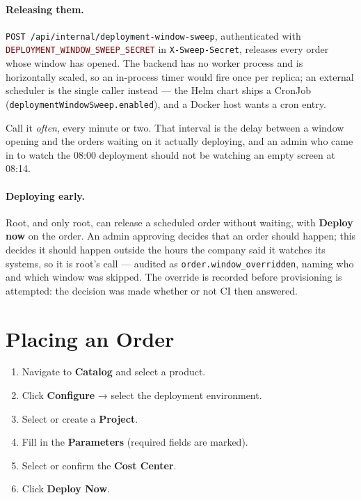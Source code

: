 \documentclass[12pt,a4paper,twoside]{report}
\newcommand{\code}[1]{\texttt{#1}}
\newcommand{\env}[1]{\texttt{\textcolor{Maroon}{#1}}}
\newcommand{\menu}[1]{\textsf{\textbf{#1}}}
\begin{document}
\paragraph{Releasing them.} \code{POST /api/internal/deployment-window-sweep},
authenticated with \env{DEPLOYMENT\_WINDOW\_SWEEP\_SECRET} in
\code{X-Sweep-Secret}, releases every order whose window has opened. The backend
has no worker process and is horizontally scaled, so an in-process timer would
fire once per replica; an external scheduler is the single caller instead --- the
Helm chart ships a CronJob (\code{deploymentWindowSweep.enabled}), and a Docker
host wants a cron entry.

Call it \emph{often}, every minute or two. That interval is the delay between a
window opening and the orders waiting on it actually deploying, and an admin who
came in to watch the 08:00 deployment should not be watching an empty screen at
08:14.

\paragraph{Deploying early.} Root, and only root, can release a scheduled order
without waiting, with \menu{Deploy now} on the order. An admin approving decides
that an order should happen; this decides it should happen outside the hours the
company said it watches its systems, so it is root's call --- audited as
\code{order.window\_overridden}, naming who and which window was skipped. The
override is recorded before provisioning is attempted: the decision was made
whether or not CI then answered.

\section{Placing an Order}

\begin{enumerate}
  \item Navigate to \textbf{Catalog} and select a product.
  \item Click \textbf{Configure} → select the deployment environment.
  \item Select or create a \textbf{Project}.
  \item Fill in the \textbf{Parameters} (required fields are marked).
  \item Select or confirm the \textbf{Cost Center}.
  \item Click \textbf{Deploy Now}.
\end{enumerate}
\end{document}
